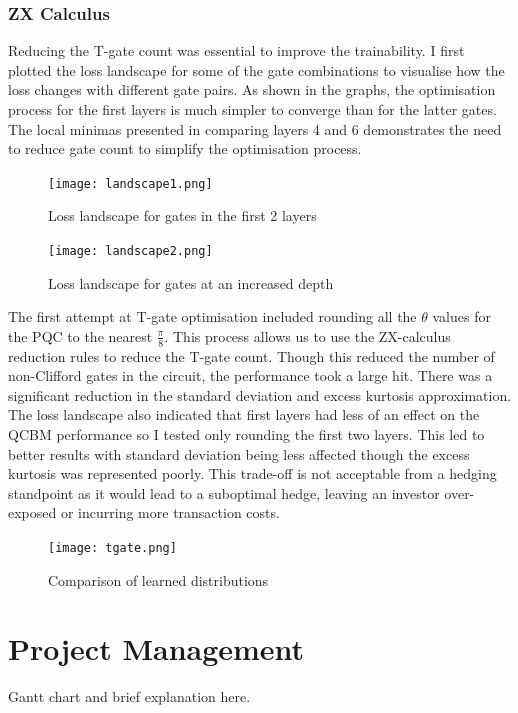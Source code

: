 \documentclass[12pt]{article}
\numberwithin{equation}{section}
\begin{document}
\subsubsection{ZX Calculus}
Reducing the T-gate count was essential to improve the trainability. 
I first plotted the loss landscape for some of the gate combinations to visualise 
how the loss changes with different gate pairs. As shown in the graphs, the 
optimisation process for the first layers is much simpler to converge than for 
the latter gates. The local minimas presented in comparing layers 4 and 6 
demonstrates the need to reduce gate count to simplify the optimisation process. 
\begin{figure}[h!]
    \centering
    \begin{minipage}{0.48\textwidth}
        \centering
        \texttt{[image: landscape1.png]}
        \caption{Loss landscape for gates in the first 2 layers}
        \label{fig:landscape1}
    \end{minipage}
    \hfill
    \begin{minipage}{0.48\textwidth}
        \centering
        \texttt{[image: landscape2.png]}
        \caption{Loss landscape for gates at an increased depth}
        \label{fig:landscape2}
    \end{minipage}
\end{figure}
The first attempt at T-gate optimisation included rounding all the $\theta$ values 
for the PQC to the nearest $\frac{\pi}{8}$. This process allows us to use the 
ZX-calculus reduction rules to reduce the T-gate count. Though this reduced the 
number of non-Clifford gates in the circuit, the performance took a large hit. 
There was a significant reduction in the standard deviation and excess kurtosis
approximation. The loss landscape also indicated that first layers had less of an 
effect on the QCBM performance so I tested only rounding the first two layers. 
This led to better results with standard deviation being less affected though the 
excess kurtosis was represented poorly. This trade-off is not acceptable from a 
hedging standpoint as it would lead to a suboptimal hedge, leaving an investor 
over-exposed or incurring more transaction costs.  
\begin{figure}[h!]
    \centering
    \texttt{[image: tgate.png]}
    \caption{Comparison of learned distributions}
\end{figure}
\newpage 
\section{Project Management}
Gantt chart and brief explanation here.
\newpage
\end{document}
